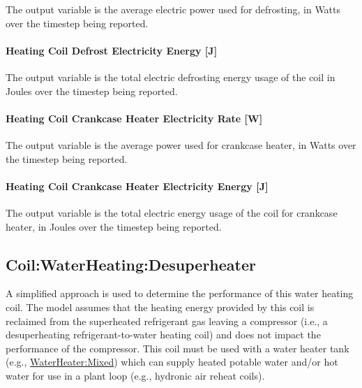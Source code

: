 The output variable is the average electric power used for defrosting, in Watts over the timestep being reported.

\paragraph{Heating Coil Defrost Electricity Energy {[}J{]}}\label{heating-coil-defrost-electric-energy-j-2}

The output variable is the total electric defrosting energy usage of the coil in Joules over the timestep being reported.

\paragraph{Heating Coil Crankcase Heater Electricity Rate {[}W{]}}\label{heating-coil-crankcase-heater-electric-power-w-2}

The output variable is the average power used for crankcase heater, in Watts over the timestep being reported.

\paragraph{Heating Coil Crankcase Heater Electricity Energy {[}J{]}}

The output variable is the total electric energy usage of the coil for crankcase heater, in Joules over the timestep being reported.

\subsection{Coil:WaterHeating:Desuperheater}\label{coilwaterheatingdesuperheater}

A simplified approach is used to determine the performance of this water heating coil. The model assumes that the heating energy provided by this coil is reclaimed from the superheated refrigerant gas leaving a compressor (i.e., a desuperheating refrigerant-to-water heating coil) and does not impact the performance of the compressor. This coil must be used with a water heater tank (e.g., \hyperref[waterheatermixed]{WaterHeater:Mixed}) which can supply heated potable water and/or hot water for use in a plant loop (e.g., hydronic air reheat coils).


